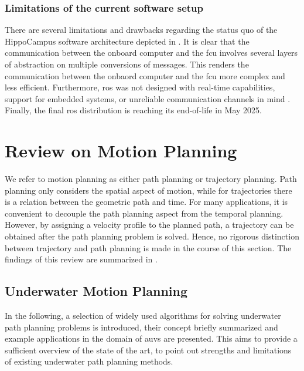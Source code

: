 \subsubsection{Limitations of the current software setup}\label{sec:sw_limitatations}

There are several limitations and drawbacks regarding the status quo of the HippoCampus software architecture depicted in .
It is clear that the communication between the onboard computer and the \ac{fcu} involves several layers of abstraction on multiple conversions of messages.
This renders the communication between the onbaord computer and the \ac{fcu} more complex and less efficient.
Furthermore, \ac{ros} was not designed with real-time capabilities, support for embedded systems, or unreliable communication channels in mind \cite{ros2}. Finally, the final \ac{ros} distribution is reaching its end-of-life in May 2025.

%


\section{Review on Motion Planning}
\label{sec:review-motion-planning}
We refer to motion planning as either path planning or trajectory planning. Path planning only considers the spatial aspect of motion, while for trajectories there is a relation between the geometric path and time. 
For many applications, it is convenient to decouple the path planning aspect from the temporal planning. 
However, by assigning a velocity profile to the planned path, a trajectory can be obtained after the path planning problem is solved. Hence, no rigorous distinction between trajectory and path planning is made in the course of this section.
The findings of this review are summarized in .

\subsection{Underwater Motion Planning}
\label{sec:underwater-motion-planning}

In the following, a selection of widely used algorithms for solving underwater path planning problems is introduced, their concept briefly summarized and example applications in the domain of \acp{auv} are presented. This aims to provide a sufficient overview of the state of the art, to point out strengths and limitations of existing underwater path planning methods.

